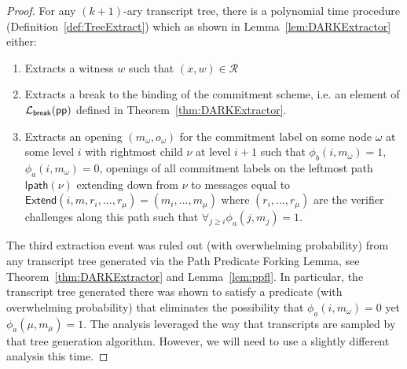 \begin{proof}
	 For any $(k+1)$-ary transcript tree, there is a polynomial time procedure (Definition~\ref{def:TreeExtract}) which as shown in Lemma~\ref{lem:DARKExtractor} either: 
	 \begin{enumerate}[label=(\alph*)]
	 	\item Extracts a witness $w$ such that $(x, w) \in \mathcal{R}$
	 	\item Extracts a break to the binding of the commitment scheme, i.e. an element of $\mathcal{L}_\textsf{break}(\textsf{pp})$ defined in Theorem~\ref{thm:DARKExtractor}.
	 	\item Extracts an opening $(m_\omega, o_\omega)$ for the commitment label on some node $\omega$ at some level $i$ with rightmost child $\nu$ at level $i+1$ such that $\phi_b(i, m_\omega) = 1$, $\phi_a(i, m_\omega) = 0$, openings of all commitment labels on the leftmost path $\textsf{lpath}(\nu)$ extending down from $\nu$ to messages equal to $\textsf{Extend}(i, m, r_i,...,r_\mu) = (m_i,...,m_\mu)$ where $(r_i,...,r_\mu)$ are the verifier challenges along this path such that $\forall_{j \geq i} \phi_a(j, m_j) = 1$. 
	 \end{enumerate}
	 
	 The third extraction event was ruled out (with overwhelming probability) from any transcript tree generated via the Path Predicate Forking Lemma, see Theorem~\ref{thm:DARKExtractor} and Lemma~\ref{lem:ppfl}. In particular, the transcript tree generated there was shown to satisfy a predicate (with overwhelming probability) that eliminates the possibility that $\phi_a(i, m_\omega) = 0$ yet $\phi_a(\mu, m_\mu) = 1$. The analysis leveraged the way that transcripts are sampled by that tree generation algorithm. However, we will need to use a slightly different analysis this time.  
	 

\end{proof}
